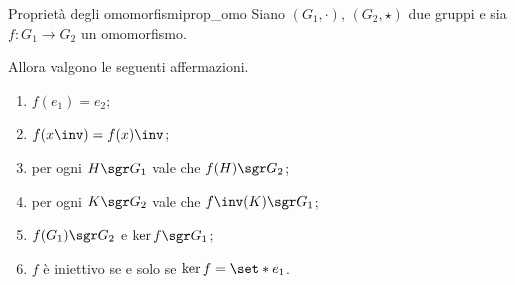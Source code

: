 \begin{proposition}
    {Proprietà degli omomorfismi}{prop_omo}
    Siano $(G_1, \cdot)$, $(G_2, \star)$ due gruppi e sia $f : G_1 \to G_2$ un omomorfismo.

    Allora valgono le seguenti affermazioni.
    \begin{enumerate}[label={(\roman*)}]
        \item \label{prop:prop_omo:e_va_in_e'}$f(e_1) = e_2$;
        \item \label{prop:prop_omo:inv_passa_dentro}$f(x\inv) = f(x)\inv$;
        \item \label{prop:prop_omo:f(H)_sgr_cod} per ogni $H \sgr G_1$ vale che $f(H) \sgr G_2$;
        \item \label{prop:prop_omo:f\inv(K)_sgr_dom}  per ogni $K \sgr G_2$ vale che $f\inv(K) \sgr G_1$;
        \item \label{prop:prop_omo:imm_ker_sgr}$f(G_1) \sgr G_2$ e $\ker f \sgr G_1$;
        \item \label{prop:prop_omo:cond_iniett}$f$ è iniettivo se e solo se $\ker f = \set*{e_1}$.
    \end{enumerate}
\end{proposition}
